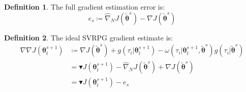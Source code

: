\documentclass{article}
\theoremstyle{remark}
\theoremstyle{definition}
\newtheorem{definition}{Definition}[section]
\newcommand{\dnabla}{\nabla\!\!\!\!\nabla}
\newcommand{\vtheta}{\boldsymbol{\theta}}
\newcommand{\Reward}{\mathcal{R}}
\newcommand{\gradJ}[1]{\nabla J(#1)}
\newcommand{\gradApp}[2]{\widehat{\nabla}_{#2}J(#1)}
\newcommand{\gradBlack}[1]{\blacktriangledown J(#1)}
\newcommand{\gradIdeal}[1]{\dnabla J(#1)}
\newcommand{\wt}[1]{\widetilde{#1}}
\begin{document}
\begin{definition}
The full gradient estimation error is:
\[
	e_s \coloneqq \gradApp{\wt{\vtheta}^s}{N} - \gradJ{\wt{\vtheta}^s} 
\]
\end{definition}

\begin{definition}\label{def:ideal}
The ideal SVRPG gradient estimate is:
\begin{align*}
	\gradIdeal{\vtheta_t^{s+1}} &\coloneqq 
	\gradJ{\wt{\vtheta}^s}
    + g(\tau_i|\vtheta^{s+1}_t)
    - \omega(\tau_i|\vtheta^{s+1}_t, \wt{\vtheta}^s) g(\tau_i|\wt{\vtheta}^s)
    \\
	&= \gradBlack{\vtheta_t^{s+1}} - \gradApp{\wt{\vtheta}^s}{N} + \gradJ{\wt{\vtheta}^s} \\
	&= \gradBlack{\vtheta_t^{s+1}} - e_s
\end{align*}
\end{definition}
\end{document}
